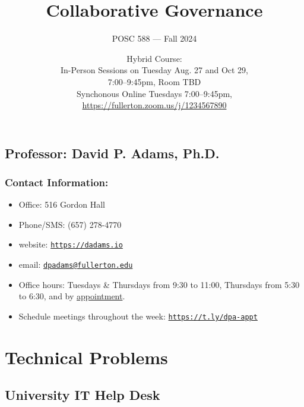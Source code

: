 \documentclass[12pt, letterpaper]{article}
\begin{document}
\title{Collaborative Governance}

\author{POSC 588 — Fall 2024}
\date{Hybrid Course: \\ \vspace*{0.5em}
    In-Person Sessions on Tuesday Aug. 27 and Oct 29,\\7:00–9:45pm, Room TBD \\\vspace{0.5em}
    Synchonous Online Tuesdays 7:00–9:45pm, \href{https://fullerton.zoom.us/j/1234567890}{https://fullerton.zoom.us/j/1234567890}}

    \maketitle


\subsection*{Professor: David P. Adams, Ph.D.}

\subsubsection*{Contact Information:}

\begin{itemize}
	\item Office: 516 Gordon Hall
	\item Phone/SMS: (657) 278-4770
	\item website: \href{https://dadams.io}{\texttt{https://dadams.io}}
	\item email: \href{dpadams@fullerton.edu}{\texttt{dpadams@fullerton.edu}}
	\item Office hours: Tuesdays \& Thursdays from 9:30 to 11:00, Thursdays from 5:30 to 6:30, and by \href{https://t.ly/dpa-appt}{appointment}.
	\item Schedule meetings throughout the week: \href{https://t.ly/dpa-appt}{\texttt{https://t.ly/dpa-appt}}
\end{itemize}


\section{Technical Problems}

\subsection*{University IT Help Desk}
\end{document}
